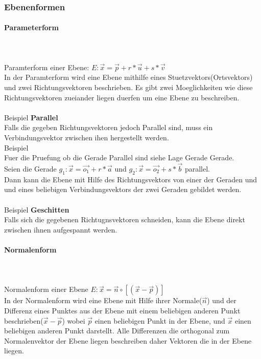\documentclass[a4paper]{article} %
\begin{document}
	\subsubsection{Ebenenformen}
	\paragraph{Parameterform}
		\hspace{0 cm} \\ \noindent \\
	Paramterform einer Ebene: $E : \vec{x} = \vec{p}+ r*\vec{u}+s*\vec{v}$\\
	In der Paramterform wird eine Ebene mithilfe eines Stuetzvektors(Ortsvektors) und zwei Richtungsvektoren beschrieben.
	Es gibt zwei Moeglichkeiten wie diese Richtungsvektoren zueiander liegen duerfen um eine Ebene zu beschreiben.
	\\\\ Beispiel \textbf{Parallel}\\
	Falls die gegeben Richtungsvektoren jedoch Parallel sind, muss ein Verbindungsvektor zwischen ihen hergestellt werden.
	\\Beispiel\\
	Fuer die Pruefung ob die Gerade Parallel sind siehe Lage Gerade Gerade.\\
	Seien die Gerade $g_1: \vec{x}= \vec{o_1}+r*\vec{a}$ und $ g_2: \vec{x}=\vec{o_2}+s*\vec{b} $ parallel.\\
	Dann kann die Ebene mit Hilfe des Richtungsvektors von einer der Geraden und und eines beliebigen Verbindungsvektors der zwei Geraden gebildet werden. 
	\\\\ Beispiel \textbf{Geschitten}\\
	Falls sich die gegebenen Richtugnsvektoren schneiden, kann die Ebene direkt zwischen ihnen aufgespannt werden.
	\paragraph{Normalenform}
		\hspace{0 cm} \\ \noindent \\
		Normalenform einer Ebene $E : \vec{x} = \vec{n}\circ\left[\left(\vec{x}-\vec{p}\right)   \right]$\\
		In der Normalenform wird eine Ebene mit Hilfe ihrer Normale($\vec{n}$) und der Differenz eines Punktes aus der Ebene mit einem beliebigen anderen Punkt beschrieben($\vec{x}-\vec{p}$) wobei $\vec{p}$ einen beliebigen Punkt in der Ebene, und $\vec{x}$ einen beliebigen anderen Punkt darstellt. Alle Differenzen die orthogonal zum Normalenvektor der Ebene liegen beschreiben daher Vektoren die in der Ebene liegen.
\end{document}
